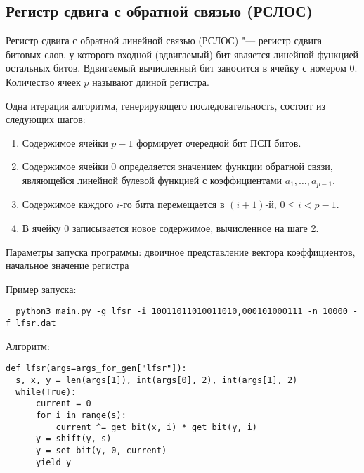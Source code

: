 \documentclass[spec, och, labwork]{shiza}
\begin{document}

\subsection{Регистр сдвига с обратной связью (РСЛОС)}

Регистр сдвига с обратной линейной связью (РСЛОС) "--- регистр сдвига битовых слов, у которого входной (вдвигаемый) бит является линейной функцией остальных битов. Вдвигаемый вычисленный бит заносится в 
ячейку с номером 0. Количество ячеек $p$ называют длиной регистра.

Одна итерация алгоритма, генерирующего последовательность, состоит 
из следующих шагов:
\begin{enumerate}
  \item Содержимое ячейки $p - 1$ формирует очередной бит ПСП битов.
  \item Содержимое ячейки 0 определяется значением функции обратной связи, 
  являющейся линейной булевой функцией с коэффициентами $a_1, \dots, a_{p - 1}$.
  \item Содержимое каждого $i$-го бита перемещается в $(i + 1)$-й, $0 \leq i < p - 1$. 
  \item В ячейку 0 записывается новое содержимое, вычисленное на шаге 2.
\end{enumerate}

Параметры запуска программы: двоичное представление вектора коэффициентов, начальное значение регистра

Пример запуска:
\begin{small}
\begin{verbatim}
  python3 main.py -g lfsr -i 10011011010011010,000101000111 -n 10000 -f lfsr.dat
\end{verbatim}
\end{small}

Алгоритм:
\begin{small}
\begin{verbatim}
def lfsr(args=args_for_gen["lfsr"]):
  s, x, y = len(args[1]), int(args[0], 2), int(args[1], 2)
  while(True):
      current = 0
      for i in range(s):
          current ^= get_bit(x, i) * get_bit(y, i)
      y = shift(y, s)
      y = set_bit(y, 0, current)
      yield y
\end{verbatim}
\end{small}




\end{document}
